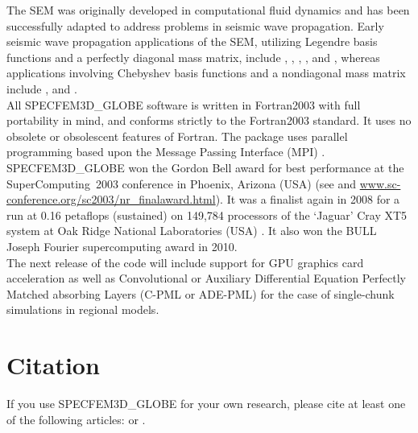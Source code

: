 \documentclass[oneside,english]{book}
\begin{document}
The SEM was originally developed in computational fluid dynamics \citep{Pat84,MaPa89}
and has been successfully adapted to address problems in seismic wave propagation.
Early seismic wave propagation applications of the SEM, utilizing Legendre basis functions and a
perfectly diagonal mass matrix, include \cite{CoJoTo93}, \cite{Kom97},
\cite{FaMaPaQu97}, \cite{CaGa97}, \cite{KoVi98} and \cite{KoTr99},
whereas applications involving Chebyshev basis functions and a nondiagonal mass matrix
include \cite{SePr94}, \cite{PrCaSe94} and \cite{SePrPr95}.\\

All SPECFEM3D\_GLOBE software is written in Fortran2003 with full portability
in mind, and conforms strictly to the Fortran2003 standard. It uses
no obsolete or obsolescent features of Fortran. The package uses
parallel programming based upon the Message Passing Interface (MPI)
\citep{GrLuSk94,Pac97}.\\

SPECFEM3D\_GLOBE won the Gordon Bell award for best performance at the SuperComputing~2003
conference in Phoenix, Arizona (USA) (see \cite{KoTsChTr03}
and \url{www.sc-conference.org/sc2003/nr_finalaward.html}).
It was a finalist again in 2008 for a run at 0.16 petaflops (sustained) on 149,784 processors of the `Jaguar' Cray XT5 system at Oak Ridge National Laboratories (USA) \citep{CaKoLaTiMiLeSnTr08}.
It also won the BULL Joseph Fourier supercomputing award in 2010.\\

The next release of the code will include support for GPU graphics card acceleration \citep{KoMiEr09,KoErGoMi10,MiKo10,Kom11}
as well as Convolutional or Auxiliary Differential Equation Perfectly Matched absorbing Layers (C-PML or ADE-PML)
\citep{MaKoEz08,MaKoGe08,MaKo09,MaKoGeBr10,KoMa07} for the case of single-chunk simulations in regional models.

\section{Citation}

If you use SPECFEM3D\_GLOBE for your own research, please cite at least one
of the following articles: \cite{TrKoLi08,PeKoLuMaLeCaLeMaLiBlNiBaTr11,VaCaSaKoVi99,LeChLiKoHuTr08,LeChKoHuTr09,LeKoHuTr09,KoMiEr09,KoErGoMi10,WiKoScTr04,KoLiTrSuStSh04,ChKoViCaVaFe07,MaKoDi09,KoViCh10,CaKoLaTiMiLeSnTr08,TrKoHjLiZhPeBoMcFrTrHu10,KoRiTr02,KoTr02a,KoTr02b,KoTr99} or \cite{KoVi98}.\\
\end{document}
